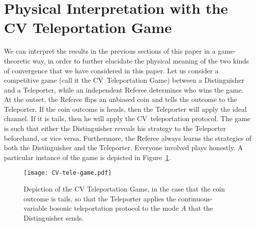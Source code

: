\documentclass[apsrev,twocolumn]{revtex4-1}%
\begin{document}
\section{Physical Interpretation with the CV Teleportation Game}

\label{sec:TP-game}

We can interpret the results in the previous sections of this paper in a
game-theoretic way, in order to further elucidate the physical meaning of the
two kinds of convergence that we have considered in this paper. Let us
consider a competitive game (call it the CV\ Teleportation Game) between a
Distinguisher and a Teleporter, while an independent Referee determines who
wins the game. At the outset, the Referee flips an unbiased coin and tells the
outcome to the Teleporter. If the coin outcome is heads, then the Teleporter
will apply the ideal channel. If it is tails, then he will apply the
CV\ teleportation protocol. The game is such that either the Distinguisher
reveals his strategy to the Teleporter beforehand, or vice versa. Furthermore,
the Referee always learns the strategies of both the Distinguisher and the
Teleporter. Everyone involved plays honestly. A particular instance of the
game is depicted in Figure~\ref{fig:CV-tele-game}.

\begin{figure}[ptb]
\begin{center}
\texttt{[image: CV-tele-game.pdf]}
\end{center}
\caption{Depiction of the CV Teleportation Game, in the case that the coin
outcome is tails, so that the Teleporter applies the continuous-variable
bosonic teleportation protocol to the mode $A$ that the Distinguisher sends.}%
\label{fig:CV-tele-game}%
\end{figure}
\end{document}
